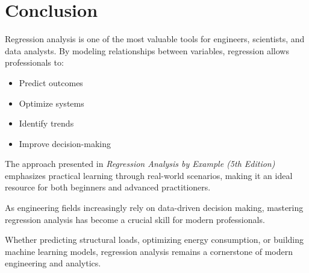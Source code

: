 \documentclass[12pt,a4paper]{article}
\begin{document}
	\section{Conclusion}
	Regression analysis is one of the most valuable tools for engineers, scientists, and data analysts. By modeling relationships between variables, regression allows professionals to:
	\begin{itemize}
		\item Predict outcomes
		\item Optimize systems
		\item Identify trends
		\item Improve decision-making
	\end{itemize}
	
	The approach presented in \textit{Regression Analysis by Example (5th Edition)} emphasizes practical learning through real-world scenarios, making it an ideal resource for both beginners and advanced practitioners.
	
	As engineering fields increasingly rely on data-driven decision making, mastering regression analysis has become a crucial skill for modern professionals.
	
	Whether predicting structural loads, optimizing energy consumption, or building machine learning models, regression analysis remains a cornerstone of modern engineering and analytics.
	
\end{document}
